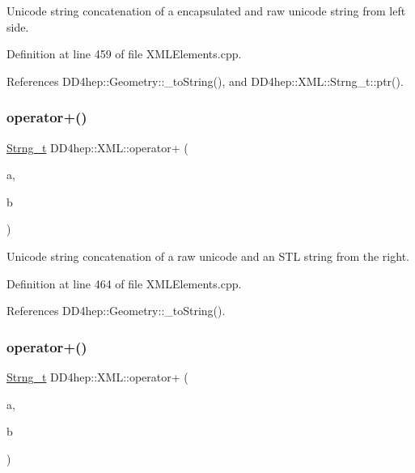 Unicode string concatenation of a encapsulated and raw unicode string from left side. 



Definition at line 459 of file X\+M\+L\+Elements.\+cpp.



References D\+D4hep\+::\+Geometry\+::\+\_\+to\+String(), and D\+D4hep\+::\+X\+M\+L\+::\+Strng\+\_\+t\+::ptr().

\hypertarget{group___d_d4_h_e_p___x_m_l_ga818876f0e3a3be20c11eeb6ea2871bdc}{}\label{group___d_d4_h_e_p___x_m_l_ga818876f0e3a3be20c11eeb6ea2871bdc} 
\subsubsection{\texorpdfstring{operator+()}{operator+()}\hspace{0.1cm}{\footnotesize\ttfamily [8/14]}}
{\footnotesize\ttfamily \hyperlink{class_d_d4hep_1_1_x_m_l_1_1_strng__t}{Strng\+\_\+t} D\+D4hep\+::\+X\+M\+L\+::operator+ (\begin{DoxyParamCaption}\item[{const \hyperlink{namespace_d_d4hep_1_1_x_m_l_a09e5d9cc86ed782f6826dfe0778c1815}{Xml\+Char} $\ast$}]{a,  }\item[{const std\+::string \&}]{b }\end{DoxyParamCaption})}



Unicode string concatenation of a raw unicode and an S\+TL string from the right. 



Definition at line 464 of file X\+M\+L\+Elements.\+cpp.



References D\+D4hep\+::\+Geometry\+::\+\_\+to\+String().

\hypertarget{group___d_d4_h_e_p___x_m_l_ga2158e654f7603cf773042a5cb231f398}{}\label{group___d_d4_h_e_p___x_m_l_ga2158e654f7603cf773042a5cb231f398} 
\subsubsection{\texorpdfstring{operator+()}{operator+()}\hspace{0.1cm}{\footnotesize\ttfamily [9/14]}}
{\footnotesize\ttfamily \hyperlink{class_d_d4hep_1_1_x_m_l_1_1_strng__t}{Strng\+\_\+t} D\+D4hep\+::\+X\+M\+L\+::operator+ (\begin{DoxyParamCaption}\item[{const std\+::string \&}]{a,  }\item[{const \hyperlink{namespace_d_d4hep_1_1_x_m_l_a09e5d9cc86ed782f6826dfe0778c1815}{Xml\+Char} $\ast$}]{b }\end{DoxyParamCaption})}




